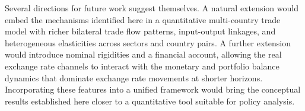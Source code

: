 \documentclass[11pt]{article}
\theoremstyle{plain}
\theoremstyle{remark}
\numberwithin{lemma}{section}
\numberwithin{proposition}{section}
\numberwithin{corollary}{section}
\begin{document}
Several directions for future work suggest themselves. A natural extension would embed the mechanisms identified here in a quantitative multi-country trade model with richer bilateral trade flow patterns, input-output linkages, and heterogeneous elasticities across sectors and country pairs. A further extension would introduce nominal rigidities and a financial account, allowing the real exchange rate channels to interact with the monetary and portfolio balance dynamics that dominate exchange rate movements at shorter horizons. Incorporating these features into a unified framework would bring the conceptual results established here closer to a quantitative tool suitable for policy analysis.

\newpage

% 

\end{document}
